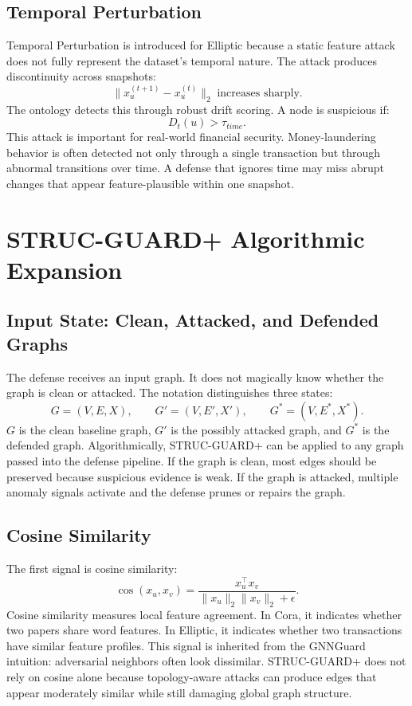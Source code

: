 \documentclass[12pt,oneside]{report}
\begin{document}
\section{Temporal Perturbation}
Temporal Perturbation is introduced for Elliptic because a static feature attack does not fully represent the dataset's temporal nature. The attack produces discontinuity across snapshots:
$$
\|x_u^{(t+1)}-x_u^{(t)}\|_2\;\text{increases sharply}.
$$
The ontology detects this through robust drift scoring. A node is suspicious if:
$$
D_t(u)>\tau_{time}.
$$
This attack is important for real-world financial security. Money-laundering behavior is often detected not only through a single transaction but through abnormal transitions over time. A defense that ignores time may miss abrupt changes that appear feature-plausible within one snapshot.

\chapter{STRUC-GUARD+ Algorithmic Expansion}

\section{Input State: Clean, Attacked, and Defended Graphs}
The defense receives an input graph. It does not magically know whether the graph is clean or attacked. The notation distinguishes three states:
$$
G=(V,E,X),\qquad
G'=(V,E',X'),\qquad
G^*=(V,E^*,X^*).
$$
$G$ is the clean baseline graph, $G'$ is the possibly attacked graph, and $G^*$ is the defended graph. Algorithmically, STRUC-GUARD+ can be applied to any graph passed into the defense pipeline. If the graph is clean, most edges should be preserved because suspicious evidence is weak. If the graph is attacked, multiple anomaly signals activate and the defense prunes or repairs the graph.

\section{Cosine Similarity}
The first signal is cosine similarity:
$$
\cos(x_u,x_v)=\frac{x_u^\top x_v}{\|x_u\|_2\|x_v\|_2+\epsilon}.
$$
Cosine similarity measures local feature agreement. In Cora, it indicates whether two papers share word features. In Elliptic, it indicates whether two transactions have similar feature profiles. This signal is inherited from the GNNGuard intuition: adversarial neighbors often look dissimilar. STRUC-GUARD+ does not rely on cosine alone because topology-aware attacks can produce edges that appear moderately similar while still damaging global graph structure.
\end{document}
